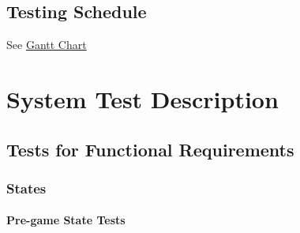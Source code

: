 \documentclass[12pt, titlepage]{article}
\begin{document}
\subsection{Testing Schedule}

See \href{https://gitlab.cas.mcmaster.ca/nagyj2/Staroids/tree/master/ProjectSchedule/StaroidsGantt.pdf}{Gantt Chart}

\section{System Test Description}

\subsection{Tests for Functional Requirements}

\subsubsection{States}

\paragraph{Pre-game State Tests}
\end{document}
